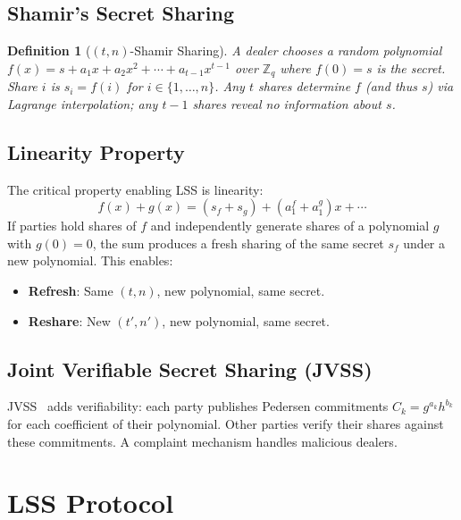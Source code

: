 \documentclass[11pt]{article}
\newtheorem{definition}{Definition}
\begin{document}
\subsection{Shamir's Secret Sharing}

\begin{definition}[$(t, n)$-Shamir Sharing]
A dealer chooses a random polynomial $f(x) = s + a_1 x + a_2 x^2 + \cdots + a_{t-1} x^{t-1}$ over $\mathbb{Z}_q$ where $f(0) = s$ is the secret. Share $i$ is $s_i = f(i)$ for $i \in \{1, \ldots, n\}$. Any $t$ shares determine $f$ (and thus $s$) via Lagrange interpolation; any $t - 1$ shares reveal no information about $s$.
\end{definition}

\subsection{Linearity Property}

The critical property enabling LSS is linearity:
\begin{equation}
  f(x) + g(x) = (s_f + s_g) + (a_1^f + a_1^g)x + \cdots
\end{equation}
If parties hold shares of $f$ and independently generate shares of a polynomial $g$ with $g(0) = 0$, the sum produces a fresh sharing of the same secret $s_f$ under a new polynomial. This enables:
\begin{itemize}[nosep]
  \item \textbf{Refresh}: Same $(t, n)$, new polynomial, same secret.
  \item \textbf{Reshare}: New $(t', n')$, new polynomial, same secret.
\end{itemize}

\subsection{Joint Verifiable Secret Sharing (JVSS)}

JVSS~\cite{pedersen1991} adds verifiability: each party publishes Pedersen commitments $C_k = g^{a_k} h^{b_k}$ for each coefficient of their polynomial. Other parties verify their shares against these commitments. A complaint mechanism handles malicious dealers.

\section{LSS Protocol}
\end{document}
